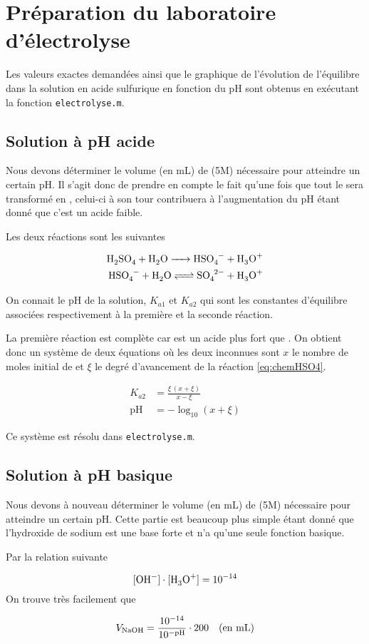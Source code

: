 \section{Préparation du laboratoire d'électrolyse}

Les valeurs exactes demandées ainsi que le graphique de l'évolution de l'équilibre
dans la solution en acide sulfurique en fonction du pH sont obtenus en
exécutant la fonction \texttt{electrolyse.m}.

\subsection{Solution à pH acide}

Nous devons déterminer le volume (en \si{\milli\liter}) de  (5M)
nécessaire pour atteindre un certain pH.
Il s'agit donc de prendre en compte le fait qu'une fois que tout 
le  sera transformé en , celui-ci à son tour contribuera
à l'augmentation du pH étant donné que c'est un acide faible.

Les deux réactions sont les suivantes

\begin{align}
	\ce{H2SO4 + H2O -> HSO4- + H3O+} \nonumber \\
	\ce{HSO4- + H2O <=> SO4^{2-} + H3O+} \label{eq:chemHSO4}
\end{align}

On connait le pH de la solution, $K_{a1}$ et $K_{a2}$ qui sont les constantes 
d'équilibre associées respectivement à la première et la seconde réaction.

La première réaction est complète car  est un acide plus fort que .
On obtient donc un système de deux équations où les deux inconnues
sont $x$ le nombre de moles initial de  et $\xi$
le degré d'avancement de la réaction \ref{eq:chemHSO4}.

\begin{align*}
	K_{a2} &= \frac{\xi \, (x + \xi)}{x - \xi} \\
	\text{pH} &= - \log_{10}{(x + \xi)} 
\end{align*}

Ce système est résolu dans \texttt{electrolyse.m}.

\subsection{Solution à pH basique}

Nous devons à nouveau déterminer le volume (en \si{\milli\liter}) 
de  (5M) nécessaire pour atteindre un certain pH.
Cette partie est beaucoup plus simple étant donné que l'hydroxide de sodium
est une base forte et n'a qu'une seule fonction basique.

Par la relation suivante

\[
	[\ce{OH-}] \cdot [\ce{H3O+}] = 10^{-14} 
\]
On trouve très facilement que 

\[
	V_{\ce{NaOH}} = \frac{10^{-14}}{10^{- \text{pH}}} \cdot 200 
	\quad \text{(en \si{\milli\liter})}
\]



